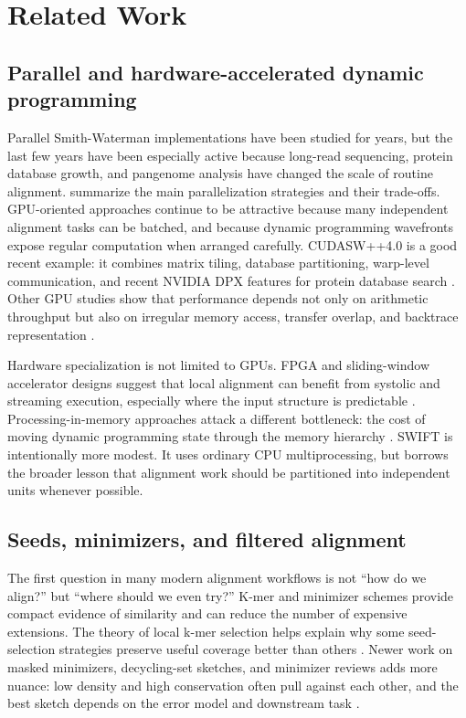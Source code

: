 \documentclass[11pt]{article}
\begin{document}
\section{Related Work}
\subsection{Parallel and hardware-accelerated dynamic programming}
Parallel Smith-Waterman implementations have been studied for years, but the last few years have been especially active because long-read sequencing, protein database growth, and pangenome analysis have changed the scale of routine alignment. \citet{xia2022parallel_sw_review} summarize the main parallelization strategies and their trade-offs. GPU-oriented approaches continue to be attractive because many independent alignment tasks can be batched, and because dynamic programming wavefronts expose regular computation when arranged carefully. CUDASW++4.0 is a good recent example: it combines matrix tiling, database partitioning, warp-level communication, and recent NVIDIA DPX features for protein database search \citep{schmidt2024cudasw4}. Other GPU studies show that performance depends not only on arithmetic throughput but also on irregular memory access, transfer overlap, and backtrace representation \citep{aguadopuig2022wfa_gpu_access,aguadopuig2023wfagpu,perezwohlfeil2023gpu_irregular,wang2024gpu_sw}.

Hardware specialization is not limited to GPUs. FPGA and sliding-window accelerator designs suggest that local alignment can benefit from systolic and streaming execution, especially where the input structure is predictable \citep{alvarez2023wfafpga,baik2023sliding_window_sw}. Processing-in-memory approaches attack a different bottleneck: the cost of moving dynamic programming state through the memory hierarchy \citep{diab2023aim,diab2022wfa_pim}. SWIFT is intentionally more modest. It uses ordinary CPU multiprocessing, but borrows the broader lesson that alignment work should be partitioned into independent units whenever possible.

\subsection{Seeds, minimizers, and filtered alignment}
The first question in many modern alignment workflows is not ``how do we align?'' but ``where should we even try?'' K-mer and minimizer schemes provide compact evidence of similarity and can reduce the number of expensive extensions. The theory of local k-mer selection helps explain why some seed-selection strategies preserve useful coverage better than others \citep{shaw2022local_kmer_selection}. Newer work on masked minimizers, decycling-set sketches, and minimizer reviews adds more nuance: low density and high conservation often pull against each other, and the best sketch depends on the error model and downstream task \citep{hoang2024masked_minimizer,marcais2024small_window,ndiaye2024minimizers_review,yu2024minimizers_filters}.
\end{document}
